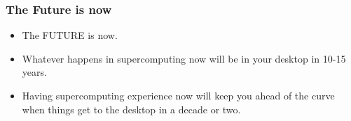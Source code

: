 \documentclass[slidestop,mathserif,compress,xcolor=svgnames,table]{beamer}
\begin{document}
\begin{frame}
  \frametitle{\small The Future is now}
  {\Large
    \begin{itemize}
      \item[] The FUTURE is now.
      \item[] {\color{blue}Whatever happens in supercomputing now will be in your desktop in 10-15 years.}
      \item[] Having supercomputing experience now will keep you ahead of the curve when things get to the desktop in a decade or two.
    \end{itemize}
  }
\end{frame}

\begin{frame}
  \frametitle{}
\end{frame}
\end{document}
